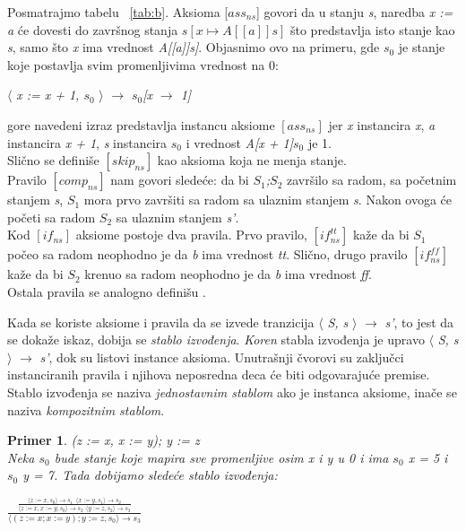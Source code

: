 \documentclass[a4paper]{article}
\newtheorem{primer}{Primer}[section]
\begin{document}
{Posmatrajmo tabelu ~\ref{tab:b}. Aksioma [$ass_{ns}$] govori da u stanju \textit{s}, naredba \textit{x := a} će dovesti do završnog stanja $s[x \mapsto A[[a]]s]$ što predstavlja isto stanje kao \textit{s}, samo što \textit{x} ima vrednost \textit{A[[a]]s]}. Objasnimo ovo na primeru, gde $s_0$ je stanje koje postavlja svim promenljivima vrednost na 0: 
\begin{center}
$\langle$ \textit{x := x + 1, $s_0$} $\rangle$ $\rightarrow$ \textit{$s_0$[x $\rightarrow$ 1]}
\end{center}
gore navedeni izraz predstavlja instancu aksiome  $[ass_{ns}]$ jer \textit{x} instancira \textit{x}, \textit{a} instancira \textit{x + 1}, \textit{s} instancira \textit{$s_0$} i vrednost \textit{A[x + 1]$s_0$} je 1.\\
Slično se definiše $[skip_{ns}] $ kao aksioma koja ne menja stanje.\\
Pravilo $[comp_{ns}] $ nam govori sledeće: da bi \textit{$S_1$;$S_2$} završilo sa radom, sa početnim stanjem \textit{s}, \textit{$S_1$} mora prvo završiti sa radom sa ulaznim stanjem \textit{s}. Nakon ovoga će početi sa radom $S_2$ sa ulaznim stanjem \textit{s’}. \\
Kod $[if_{ns}]$ aksiome postoje dva pravila. Prvo pravilo, $[if^{tt}_{ns}] $ kaže da bi \textit{$S_1$} počeo sa radom neophodno je da \textit{b} ima vrednost \textit{tt}. Slično, drugo pravilo $[if^{ff}_{ns}]$ kaže da bi \textit{$S_2$} krenuo sa radom neophodno je da \textit{b} ima vrednost \textit{ff}.\\ 
Ostala pravila se analogno definišu \cite{wiley}.


Kada se koriste aksiome i pravila da se izvede tranzicija $\langle$ \textit{S, s} $\rangle$ $\rightarrow$ \textit{s'}, to jest da se dokaže iskaz, dobija se \textit{stablo izvođenja}. \textit{Koren} stabla izvođenja je upravo $\langle$ \textit{S, s} $\rangle$ $\rightarrow$ \textit{s'}, dok su listovi instance aksioma. Unutrašnji čvorovi su zaključci instanciranih pravila i njihova neposredna deca će biti odgovarajuće premise. Stablo izvođenja se naziva \textit{jednostavnim stablom} ako je instanca aksiome, inače se naziva \textit{kompozitnim stablom}.\\

\begin{primer}
(z := x, x := y); y := z \\
Neka $s_0$ bude stanje koje mapira sve promenljive osim x i y u 0 i ima $s_0$ x = 5 i $s_0$ y = 7. Tada dobijamo sledeće stablo izvođenja:
\end{primer}
{\Large\begin{center}$\frac{\frac{\langle z := x, s_0 \rangle \rightarrow s_1\ \ \langle x := y, s_1 \rangle \rightarrow s_2}{\langle z := x, x := y, s_0\rangle \rightarrow s_2\ \ \langle y := z, s_2 \rangle \rightarrow s_3}}{\langle (z := x; x := y); y := z, s_0 \rangle \rightarrow s_3}$ \end{center}}

}
\end{document}
